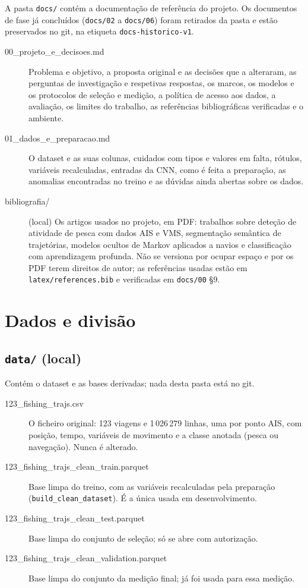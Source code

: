 \documentclass[11pt,a4paper]{article}
\newcommand{\f}[1]{\texttt{#1}}
\begin{document}
A pasta \f{docs/} contém a documentação de referência do projeto. Os documentos de fase já
concluídos (\f{docs/02} a \f{docs/06}) foram retirados da pasta e estão preservados no git, na
etiqueta \f{docs-historico-v1}.

\begin{description}
\item[00\_projeto\_e\_decisoes.md] Problema e objetivo, a proposta original e as decisões que a
  alteraram, as perguntas de investigação e respetivas respostas, os marcos, os modelos e os
  protocolos de seleção e medição, a política de acesso aos dados, a avaliação, os limites do
  trabalho, as referências bibliográficas verificadas e o ambiente.
\item[01\_dados\_e\_preparacao.md] O dataset e as suas colunas, cuidados com tipos e valores em
  falta, rótulos, variáveis recalculadas, entradas da CNN, como é feita a preparação, as anomalias
  encontradas no treino e as dúvidas ainda abertas sobre os dados.
\item[bibliografia/] (local) Os artigos usados no projeto, em PDF: trabalhos sobre deteção de
  atividade de pesca com dados AIS e VMS, segmentação semântica de trajetórias, modelos ocultos de
  Markov aplicados a navios e classificação com aprendizagem profunda. Não se versiona por ocupar
  espaço e por os PDF terem direitos de autor; as referências usadas estão em
  \f{latex/references.bib} e verificadas em \f{docs/00} §9.
\end{description}

\section{Dados e divisão}\label{sec:dados}

\subsection{\f{data/} (local)}

Contém o dataset e as bases derivadas; nada desta pasta está no git.

\begin{description}
\item[123\_fishing\_trajs.csv] O ficheiro original: 123 viagens e 1\,026\,279 linhas, uma por ponto
  AIS, com posição, tempo, variáveis de movimento e a classe anotada (pesca ou navegação). Nunca é
  alterado.
\item[123\_fishing\_trajs\_clean\_train.parquet] Base limpa do treino, com as variáveis
  recalculadas pela preparação (\f{build\_clean\_dataset}). É a única usada em desenvolvimento.
\item[123\_fishing\_trajs\_clean\_test.parquet] Base limpa do conjunto de seleção; só se abre com
  autorização.
\item[123\_fishing\_trajs\_clean\_validation.parquet] Base limpa do conjunto da medição final; já
  foi usada para essa medição.
\end{description}
\end{document}
